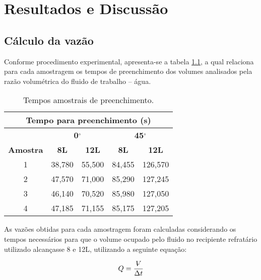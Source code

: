 \chapter{Resultados e Discussão}
\label{chap:resultados}

\section{Cálculo da vazão}
\label{sec:vazao}

Conforme procedimento experimental, apresenta-se a tabela \ref{t:tempos}, a
qual relaciona para cada amostragem os tempos de preenchimento dos volumes
analisados pela razão volumétrica do fluido de trabalho -- água.

\begin{table}[H]
\centering
\caption{Tempos amostrais de preenchimento.}
\label{t:tempos}
\begin{tabular}{|c|c|c|c|c|}
\hline
\multicolumn{5}{|c|}{\textbf{Tempo para preenchimento (s)}}                                      \\ \hline
\multicolumn{1}{|l|}{} & \multicolumn{2}{c|}{\textbf{0$^\circ$}}    & \multicolumn{2}{c|}{\textbf{45$^\circ$}}   \\ \hline
\textbf{Amostra}       & \textbf{8L} & \textbf{12L} & \textbf{8L} & \textbf{12L} \\ \hline
1                      & 38,780          & 55,500           & 84,455          & 126,570          \\ \hline
2                      & 47,570          & 71,000           & 85,290          & 127,245          \\ \hline
3                      & 46,140          & 70,520           & 85,980          & 127,050          \\ \hline
4                      & 47,185          & 71,155           & 85,175          & 127,205          \\ \hline
\end{tabular}
\end{table}

As vazões obtidas para cada amostragem foram calculadas considerando os tempos
necessários para que o volume ocupado pelo fluido no recipiente refratário
utilizado alcançasse 8 e 12L, utilizando a seguinte equação:

\newcommand{\Vol}{\mathop{\ooalign{\hfil$V$\hfil\cr\kern0.08em--\hfil\cr}}\nolimits}
\begin{equation}
  Q = \frac{\Vol}{\Delta t}
\end{equation}

